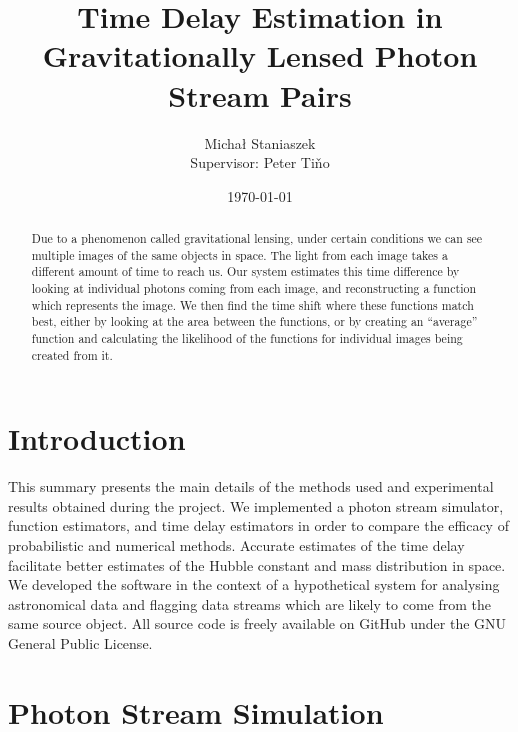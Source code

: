 \documentclass[a4paper,11pt]{article}
\title{Time Delay Estimation in Gravitationally Lensed Photon Stream Pairs}
\author{\Large{Micha{\l} Staniaszek} \\\small{Supervisor: Peter Ti{\v{n}}o}}
\date{\today}
\begin{document}
\maketitle



\begin{abstract} Due to a phenomenon called gravitational lensing, under certain
  conditions we can see multiple images of the same objects in space. The light
  from each image takes a different amount of time to reach us. Our system
  estimates this time difference by looking at individual photons coming from
  each image, and reconstructing a function which represents the image. We then
  find the time shift where these functions match best, either by looking at the
  area between the functions, or by creating an ``average'' function and
  calculating the likelihood of the functions for individual images being
  created from it.
\end{abstract}

\section{Introduction}
\label{sec-1}

  This summary presents the main details of the methods used and experimental
  results obtained during the project. We implemented a photon stream simulator,
  function estimators, and time delay estimators in order to compare the
  efficacy of probabilistic and numerical methods. Accurate estimates of the
  time delay facilitate better estimates of the Hubble constant and mass
  distribution in space. We developed the software in the context of a
  hypothetical system for analysing astronomical data and flagging data streams
  which are likely to come from the same source object. All source code is
  freely available on GitHub \cite{repo} under the GNU General Public License.
\section{Photon Stream Simulation}
\label{sec-2}
\end{document}
